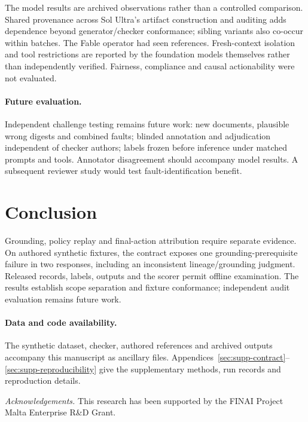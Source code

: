 \documentclass[sigconf,nonacm]{acmart}
\begin{document}
The model results are archived observations rather than a controlled comparison. Shared provenance across Sol Ultra's artifact construction and auditing adds dependence beyond generator/\allowbreak{}checker conformance; sibling variants also co-occur within batches. The Fable operator had seen references. Fresh-context isolation and tool restrictions are reported by the foundation models themselves rather than independently verified. Fairness, compliance and causal actionability were not evaluated.

\paragraph{Future evaluation.}
Independent challenge testing remains future work: new documents, plausible wrong digests and combined faults; blinded annotation and adjudication independent of checker authors; labels frozen before inference under matched prompts and tools. Annotator disagreement should accompany model results. A subsequent reviewer study would test fault-identification benefit.

\section{Conclusion}

Grounding, policy replay and final-action attribution require separate evidence. On authored synthetic fixtures, the contract exposes one grounding-prerequisite failure in two responses, including an inconsistent lineage/grounding judgment. Released records, labels, outputs and the scorer permit offline examination. The results establish scope separation and fixture conformance; independent audit evaluation remains future work.

\paragraph{Data and code availability.}
The synthetic dataset, checker, authored references and archived outputs accompany this manuscript as ancillary files. Appendices~\ref{sec:supp-contract}--\ref{sec:supp-reproducibility} give the supplementary methods, run records and reproduction details.

\clearpage
\balance


\clearpage
\nobalance
\appendix


\par\smallskip
{\small\noindent\textit{Acknowledgements.} This research has been supported by the FINAI Project Malta Enterprise R\&D Grant.\par}
\end{document}
